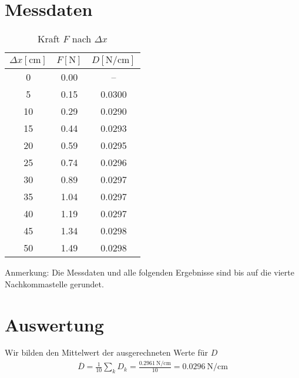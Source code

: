 \section{Messdaten}
\begin{table}
    \centering
    \caption{Kraft $ F $ nach $ \Delta x $ }
    \begin{tabular}{S S S}
        \toprule
        {$ \Delta x  [\unit{\cm}]$}  & {$ F [\unit{\newton}]  $}   & {$ D  [\unit{\newton\per\cm}] $} \\
                     &  0.00      & {--}   \\
        5             &  0.15      & 0.0300 \\
        10            &  0.29      & 0.0290 \\
        15            &  0.44      & 0.0293 \\
        20            &  0.59      & 0.0295 \\
        25            &  0.74      & 0.0296 \\
        30            &  0.89      & 0.0297 \\
        35            &  1.04      & 0.0297 \\
        40            &  1.19      & 0.0297 \\
        45            &  1.34      & 0.0298 \\
        50            &  1.49      & 0.0298 \\
        

    \end{tabular}
\end{table}

Anmerkung: Die Messdaten und alle folgenden Ergebnisse sind bis auf die vierte Nachkommastelle gerundet.

\section{Auswertung}
Wir bilden den Mittelwert der ausgerechneten Werte für $D$
\begin{align}
    \overline{D} =\frac{1}{10} \sum_{k} D_k = \frac{\qty{0.2961}{\newton\per\cm}}{10} = \qty{0.0296}{\newton\per\cm}
\end{align}

